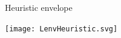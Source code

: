\documentclass{beamer}%
\begin{document}
%
%
%

\begin{frame}{Heuristic envelope}
%
 \begin{center}
   \texttt{[image: LenvHeuristic.svg]}
 \end{center}
%
%
\end{frame}

\end{document}

